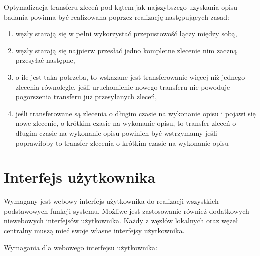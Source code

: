 \documentclass[a4paper]{report}
\begin{document}
Optymalizacja transferu zleceń pod kątem jak najszybszego uzyskania opisu badania powinna być realizowana poprzez realizację następujących zasad:
\begin{enumerate}
 \item węzły starają się w pełni wykorzystać przepustowość łączy między sobą,
 \item węzły starają się najpierw przesłać jedno kompletne zlecenie nim zaczną przesyłać następne,
 \item o ile jest taka potrzeba, to wskazane jest transferowanie więcej niż jednego zlecenia równolegle, jeśli uruchomienie nowego transferu nie powoduje pogorszenia transferu już przesyłanych zleceń,
 \item jeśli transferowane są zlecenia o długim czasie na wykonanie opisu i pojawi się nowe zlecenie, o krótkim czasie na wykonanie opisu, to transfer zleceń o długim czasie na wykonanie opisu powinien być wstrzymamy jeśli poprawiłoby to transfer zlecenia o krótkim czasie na wykonanie opisu
\end{enumerate}

\section{Interfejs użytkownika}

Wymagany jest webowy interfejs użytkownika do realizacji wszystkich podstawowych funkcji systemu. Możliwe jest zastosowanie również dodatkowych niewebowych interfejsów użytkownika. Każdy z węzłów lokalnych oraz węzeł centralny muszą mieć swoje własne interfejsy użytkownika.

Wymagania dla webowego interfejsu użytkownika:
\end{document}

